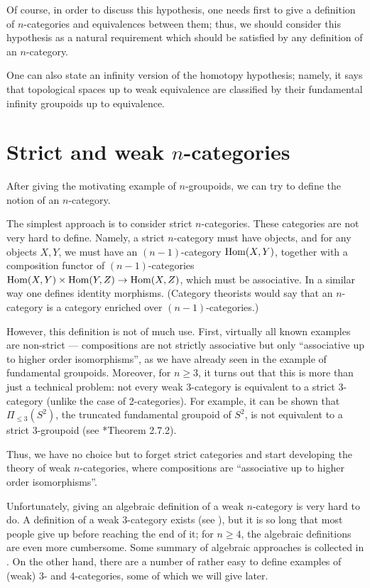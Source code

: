 Of course, in order to discuss this hypothesis, one needs first to give a
definition of $n$-categories and equivalences between them; thus, we should
consider this hypothesis as a natural requirement which should be satisfied by
any definition of an $n$-category.

One can also state an infinity version of the homotopy hypothesis; namely, it
says that topological spaces up to weak equivalence are classified by their
fundamental infinity groupoids up to equivalence.

\section{Strict and weak $n$-categories}\label{s:strict-n-cat}
After giving the motivating example of $n$-groupoids, we can try to
define the notion of an $n$-category.

The simplest approach is to consider strict $n$-categories. These categories are
not very hard to define. Namely, a strict $n$-category must have objects, and
for any objects $X,Y$, we must have an $(n-1)$-category $\operatorname{Hom} (X,Y)$, together
with a composition functor of $(n-1)$-categories $\operatorname{Hom}(X,Y)\times \operatorname{Hom}(Y,Z)\to
\operatorname{Hom}(X,Z)$, which must be associative. In a similar way one defines identity
morphisms. (Category theorists would say that an
$n$-category is a category enriched over $(n-1)$-categories.)

However, this definition is not of much use. First, virtually all known examples
are non-strict --- compositions are not strictly associative but only
``associative up to higher order isomorphisms'', as we have already seen in the
example of fundamental groupoids. Moreover, for $n\ge 3$, it turns out that this
is more than just a technical problem: not every weak 3-category is equivalent
to a strict 3-category (unlike the case of 2-categories). For example, it can be
shown that $\Pi_{\leq 3}(S^2)$, the truncated fundamental
groupoid of $S^2$, is not equivalent to a strict 3-groupoid (see
*{Theorem 2.7.2}).



Thus, we have no choice but to forget strict categories and start developing the
theory of weak $n$-categories, where compositions are ``associative up to
higher order isomorphisms''.


Unfortunately, giving an algebraic definition of a weak $n$-category is very
hard to do. A definition of a weak 3-category exists (see
), but it is so long that most people give up before
reaching the end of it; for $n\ge 4$, the algebraic definitions are even more
cumbersome. Some summary of algebraic approaches is collected in
. On the other hand, there are a number of rather easy to
define examples of (weak) 3- and 4-categories, some of which we will give
later.


